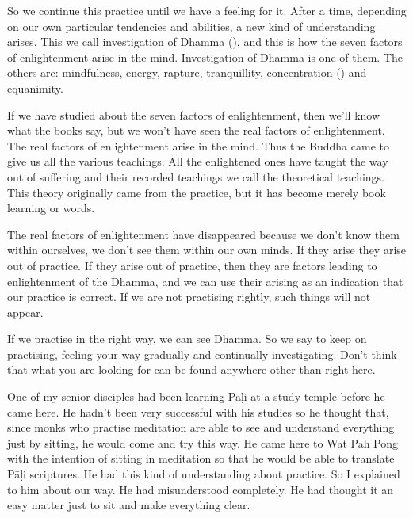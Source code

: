 \vspace*{-0.5\baselineskip}
So we continue this practice until we have a feeling for it. After a time, depending on our own particular tendencies and abilities, a new kind of understanding arises. This we call investigation of Dhamma (), and this is how the seven factors of enlightenment arise in the mind. Investigation of Dhamma is one of them. The others are: mindfulness, energy, rapture, tranquillity, concentration () and equanimity.

If we have studied about the seven factors of enlightenment, then we'll know what the books say, but we won't have seen the real factors of enlightenment. The real factors of enlightenment arise in the mind. Thus the Buddha came to give us all the various teachings. All the enlightened ones have taught the way out of suffering and their recorded teachings we call the theoretical teachings. This theory originally came from the practice, but it has become merely book learning or words.

The real factors of enlightenment have disappeared because we don't know them within ourselves, we don't see them within our own minds. If they arise they arise out of practice. If they arise out of practice, then they are factors leading to enlightenment of the Dhamma, and we can use their arising as an indication that our practice is correct. If we are not practising rightly, such things will not appear.

If we practise in the right way, we can see Dhamma. So we say to keep on practising, feeling your way gradually and continually investigating. Don't think that what you are looking for can be found anywhere other than right here.

One of my senior disciples had been learning P\=a\d{l}i at a study temple before he came here. He hadn't been very successful with his studies so he thought that, since monks who practise meditation are able to see and understand everything just by sitting, he would come and try this way. He came here to Wat Pah Pong with the intention of sitting in meditation so that he would be able to translate P\=a\d{l}i scriptures. He had this kind of understanding about practice. So I explained to him about our way. He had misunderstood completely. He had thought it an easy matter just to sit and make everything clear.

